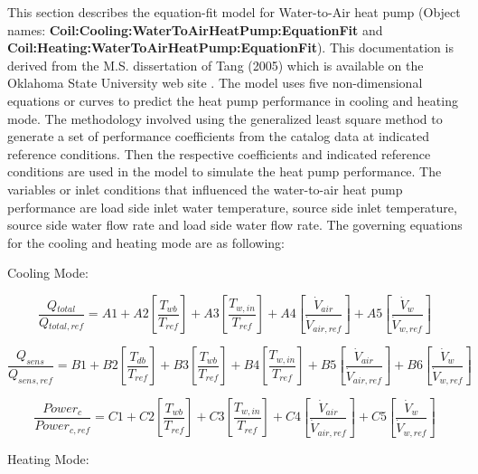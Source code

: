 This section describes the equation-fit model for Water-to-Air heat pump (Object names: \textbf{Coil:Cooling:WaterToAirHeatPump:EquationFit} and \\ \textbf{Coil:Heating:WaterToAirHeatPump:EquationFit}). This documentation is derived from the M.S. dissertation of Tang (2005) which is available on the Oklahoma State University web site . The model uses five non-dimensional equations or curves to predict the heat pump performance in cooling and heating mode. The methodology involved using the generalized least square method to generate a set of performance coefficients from the catalog data at indicated reference conditions. Then the respective coefficients and indicated reference conditions are used in the model to simulate the heat pump performance. The variables or inlet conditions that influenced the water-to-air heat pump performance are load side inlet water temperature, source side inlet temperature, source side water flow rate and load side water flow rate. The governing equations for the cooling and heating mode are as following:

Cooling Mode:

\begin{equation}
\frac{{Q{}_{total}}}{{Q{}_{total,ref}}} = A1 + A2\left[ {\frac{{{T_{wb}}}}{{{T_{ref}}}}} \right] + A3\left[ {\frac{{T{}_{w,in}}}{{T{}_{ref}}}} \right] + A4\left[ {\frac{{{{\dot V}_{air}}}}{{{{\dot V}_{air,ref}}}}} \right] + A5\left[ {\frac{{{{\dot V}_w}}}{{{{\dot V}_{w,ref}}}}} \right]
\end{equation}

\begin{equation}
\frac{{{Q_{sens}}}}{{{Q_{sens,ref}}}} = B1 + B2\left[ {\frac{{T{}_{db}}}{{T{}_{ref}}}} \right] + B3\left[ {\frac{{T{}_{wb}}}{{T{}_{ref}}}} \right] + B4\left[ {\frac{{T{}_{w,in}}}{{T{}_{ref}}}} \right] + B5\left[ {\frac{{{{\dot V}_{air}}}}{{{{\dot V}_{air,ref}}}}} \right] + B6\left[ {\frac{{\dot V{}_w}}{{\dot V{}_{w,ref}}}} \right]
\end{equation}

\begin{equation}
\frac{{Power{}_c}}{{Power{}_{c,ref}}} = C1 + C2\left[ {\frac{{{T_{wb}}}}{{{T_{ref}}}}} \right] + C3\left[ {\frac{{T{}_{w,in}}}{{T{}_{ref}}}} \right] + C4\left[ {\frac{{{{\dot V}_{air}}}}{{{{\dot V}_{air,ref}}}}} \right] + C5\left[ {\frac{{{{\dot V}_w}}}{{{{\dot V}_{w,ref}}}}} \right]
\end{equation}

Heating Mode:

